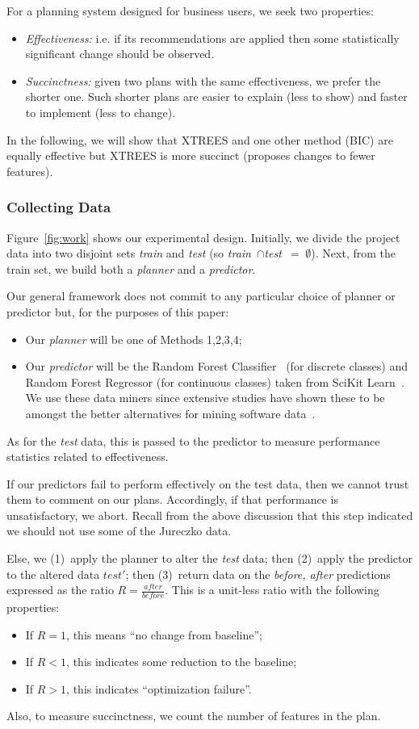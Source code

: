 \documentclass{sig-alternate}
\newcommand{\bi}{\begin{itemize}}
\newcommand{\ei}{\end{itemize}}
\newcommand{\fig}[1]{Figure~\ref{fig:#1}}
\begin{document}
For a planning system designed for business users, we seek two properties:
\bi
\item {\em Effectiveness:}    i.e.  if  its recommendations  are  applied  then  some  statistically significant  change  should  be  observed. 
\item {\em Succinctness:} given two plans with the same effectiveness, we prefer the shorter one.
Such shorter plans are easier to explain (less to show) and faster to implement (less to change).
\ei
 In the following, we will show that XTREES and one other method (BIC) are equally effective
 but XTREES is more succinct (proposes changes to fewer features). 
 
\subsubsection{Collecting Data}

\fig{work} shows our experimental design.  Initially, we divide the
project data  into two disjoint sets {\em train} and {\em test}
(so \mbox{{\em train} $\cap ${\em test} $=\;\emptyset$}).
Next, from the train set, we build both a {\em planner} and
 a {\em  predictor}. 

Our general framework does not   commit to any particular choice of { planner} or { predictor} but, for the purposes of this paper:
\bi
\item Our {\em planner} will be one of Methods 1,2,3,4;
\item Our  {\em predictor} will be the Random Forest Classifier~\cite{Breiman2001} (for discrete classes) and Random Forest Regressor (for continuous classes) taken from  SciKit Learn~\cite{Pedregosa2012}.   We use these
data miners since extensive studies have shown these to be amongst the better alternatives for mining software data~\cite{lessmann}.
\ei
As for the {\em test} data, this is passed to the { predictor}
to measure performance statistics related to effectiveness. 

If our { predictors} fail to perform effectively on the test data,
then we cannot trust them to comment on our plans. Accordingly,
if that performance is unsatisfactory, we abort. Recall from the above discussion that this step indicated
we should not use some of the  Jureczko data.

Else, we (1)~apply the { planner} to alter the {\em test} data;
then (2)~apply the { predictor} to the altered data $test'$;
then (3)~return data on the {\em before, after} predictions expressed as the ratio $R=\frac{\mathit{after}}{\mathit{before}}$.
This is a unit-less ratio with the following properties:
\bi
\item If $R= 1$, this means  ``no change from baseline''; 
\item If $R < 1$, this indicates some reduction to the baseline;
\item If $R > 1$, this indicates ``optimization failure''.
\ei
Also, to measure succinctness, we count the number of features in the plan.
\end{document}
